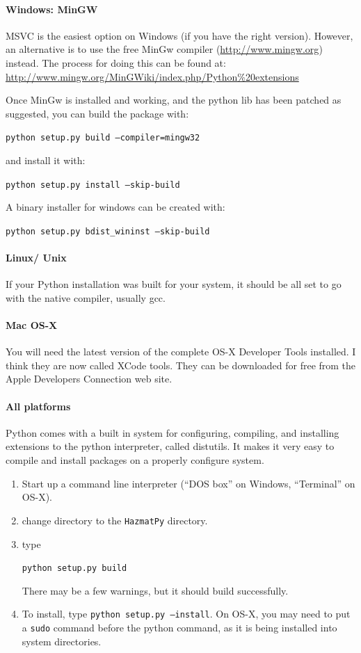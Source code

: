 \documentclass[12pt]{article}      %
\newcommand{\filename}[1]{\texttt{#1}}
\newcommand{\command}[1]{\texttt{#1}}
\newcommand{\fileline}[1]{\begin{flushleft}\texttt{#1}\end{flushleft}}
\begin{document}
\paragraph{Windows: MinGW}
MSVC is the easiest option on Windows (if you have the right version).
However, an alternative is to use the free MinGw compiler
(\url{http://www.mingw.org}) instead. The process
for doing this can be found at:\\
\url{http://www.mingw.org/MinGWiki/index.php/Python%20extensions}

Once MinGw is installed and working, and the python lib has been patched
as suggested, you can build the package with:
\fileline{python setup.py build --compiler=mingw32}
and install it with:
\fileline{python setup.py install --skip-build}
A binary installer for windows can be created with:
\fileline{python setup.py bdist\_wininst --skip-build}



\paragraph{Linux/ Unix}
If your Python installation was built for your system, it should be all
set to go with the native compiler, usually gcc.

\paragraph{Mac OS-X}
You will need the latest version of the complete OS-X Developer Tools
installed. I think they are now called XCode tools. They can be
downloaded for free from the Apple Developers Connection web site.

\paragraph{All platforms}
Python comes with a built in system for configuring, compiling, and
installing extensions to the python interpreter, called distutils. It
makes it very easy to compile and install packages on a properly
configure system.
\begin{enumerate}
\item Start up a command line interpreter (``DOS box'' on Windows,
  ``Terminal'' on OS-X).
\item change directory to the \filename{HazmatPy} directory.
\item type \fileline{python setup.py build} There may be a few warnings,
  but it should build successfully.
\item To install, type \command{python setup.py --install}. On OS-X,
  you may need to put a \command{sudo} command before the python
  command, as it is being installed into system directories.
\end{enumerate}
\end{document}
